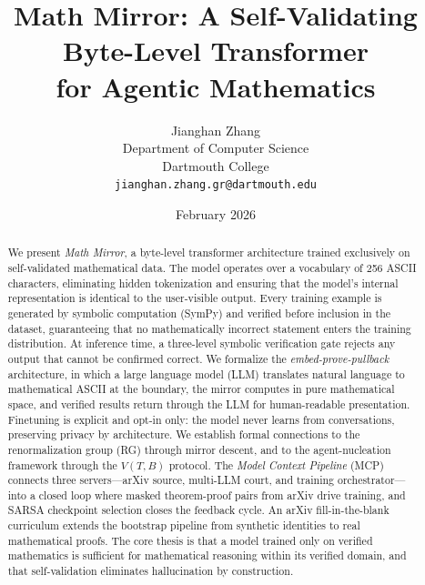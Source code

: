 \documentclass[11pt,a4paper]{article}
\title{\textbf{Math Mirror: A Self-Validating Byte-Level Transformer\\
for Agentic Mathematics}}
\author{Jianghan Zhang\\
Department of Computer Science\\
Dartmouth College\\
\texttt{jianghan.zhang.gr@dartmouth.edu}}
\date{February 2026}
\begin{document}
\maketitle

\begin{abstract}
We present \emph{Math Mirror}, a byte-level transformer architecture
trained exclusively on self-validated mathematical data.
The model operates over a vocabulary of 256 ASCII characters,
eliminating hidden tokenization and ensuring that the model's
internal representation is identical to the user-visible output.
Every training example is generated by symbolic computation
(SymPy) and verified before inclusion in the dataset,
guaranteeing that no mathematically incorrect statement
enters the training distribution.
At inference time, a three-level symbolic verification gate
rejects any output that cannot be confirmed correct.
We formalize the \emph{embed-prove-pullback} architecture,
in which a large language model (LLM) translates natural language
to mathematical ASCII at the boundary, the mirror computes
in pure mathematical space, and verified results return through
the LLM for human-readable presentation.
Finetuning is explicit and opt-in only: the model never learns
from conversations, preserving privacy by architecture.
We establish formal connections to the renormalization group (RG)
through mirror descent, and to the agent-nucleation framework
through the $V(T,B)$ protocol.
The \emph{Model Context Pipeline} (MCP) connects three servers---arXiv
source, multi-LLM court, and training orchestrator---into a closed
loop where masked theorem-proof pairs from arXiv drive training,
and SARSA checkpoint selection closes the feedback cycle.
An arXiv fill-in-the-blank curriculum extends the bootstrap
pipeline from synthetic identities to real mathematical proofs.
The core thesis is that a model trained only on verified mathematics
is sufficient for mathematical reasoning within its verified domain,
and that self-validation eliminates hallucination by construction.
\end{abstract}

\tableofcontents
\end{document}
